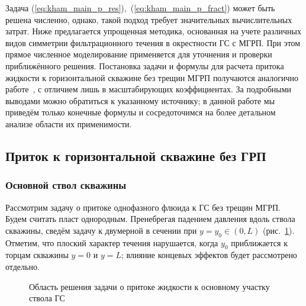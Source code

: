 \documentclass{article}
\begin{document}
Задача (\ref{eq:kham_main_p_res}),~(\ref{eq:kham_main_p_fract}) может быть
решена численно, однако, такой подход требует значительных вычислительных затрат.
Ниже предлагается упрощенная методика, основанная на учете различных видов симметрии фильтрационного течения в окрестности ГС с МГРП. При этом прямое численное моделирование применяется для уточнения и проверки приближённого решения.
Постановка задачи и формулы для расчета притока жидкости к горизонтальной
скважине без трещин МГРП получаются аналогично работе~\cite{lit:kham_mazo_uzku_2015},
с отличием лишь в масштабирующих коэффициентах. За подробными выводами можно обратиться к указанному источнику;
в данной работе мы приведём только конечные формулы и сосредоточимся
на более детальном анализе области их применимости.


\subsection{Приток к горизонтальной скважине без ГРП}

\subsubsection{Основной ствол скважины}

Рассмотрим задачу о притоке однофазного флюида к ГС без трещин МГРП. Будем считать пласт однородным. Пренебрегая падением давления вдоль ствола скважины, сведём
задачу к двумерной в сечении при $y = y_0 \in \left(0, L\right)$
(рис.~\ref{fig:kham_hw_inner_scheme}). Отметим, что плоский характер течения
нарушается, когда $y_0$ приближается к торцам скважины $y = 0$ и $y = L$; влияние концевых
эффектов будет рассмотрено отдельно.

\begin{figure}[!ht]
  \centering
  
  \caption{Область решения задачи о притоке жидкости к основному участку ствола ГС}
  \label{fig:kham_hw_inner_scheme}
\end{figure}
\end{document}
